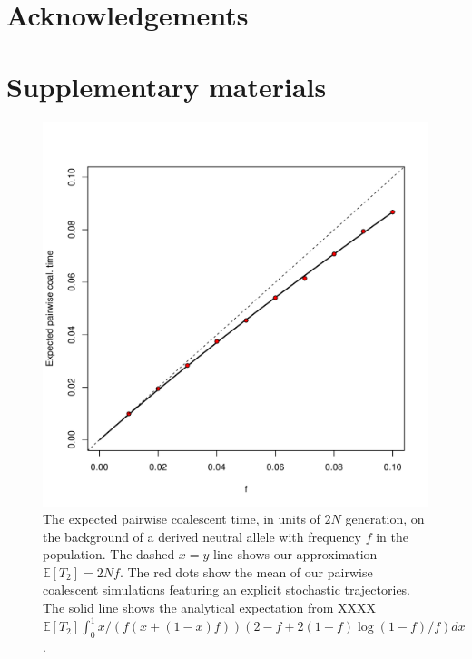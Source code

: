 \documentclass[a4paper,10pt]{article}
\begin{document}
\section*{Acknowledgements}





\section{Supplementary materials}

\setcounter{table}{0}
\renewcommand{\thetable}{S\arabic{table}}
\setcounter{figure}{0}
\renewcommand{\thefigure}{S\arabic{figure}}


\begin{figure}
	\includegraphics[width = \textwidth]{../Paper_Figures/n_two_coal_time.pdf} 
\caption{The expected pairwise coalescent time, in units of $2N$ generation, on the background of a derived neutral allele with frequency $f$ in the population.  The dashed $x=y$ line shows our approximation $\mathbb{E}  [T_2]=2Nf$. The red dots show the mean of our pairwise coalescent simulations featuring an explicit stochastic trajectories. The solid line shows the analytical expectation from XXXX  
$\mathbb{E} [T_2] \int_0^1 x/(f (x+(1-x)f))(2-f+2(1-f) \log(1-f)/f) dx $.}
\label{n_2_supp_plot}
\end{figure}   %
\end{document}
